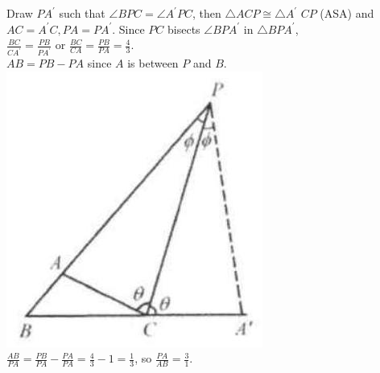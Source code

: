 \documentclass{article}
\begin{document}
Draw \(P A^{\prime}\) such that \(\angle B P C=\angle A^{\prime} P C\), then \(\triangle A C P \cong \triangle A^{\prime}\) \(C P\) (ASA) and \(A C=A^{\prime} C, P A=P A^{\prime}\). Since \(P C\) bisects \(\angle B P A^{\prime}\) in \(\triangle B P A^{\prime}\),\\
\(\frac{B C}{C A^{\prime}}=\frac{P B}{P A^{\prime}}\) or \(\frac{B C}{C A}=\frac{P B}{P A}=\frac{4}{3}\).\\
\(A B=P B-P A\) since \(A\) is between \(P\) and \(B\).\\
\centering
\includegraphics[width=\textwidth]{images/reasoning_image_1.jpg}\\
\(\frac{A B}{P A}=\frac{P B}{P A}-\frac{P A}{P A}=\frac{4}{3}-1=\frac{1}{3}\), so \(\frac{P A}{A B}=\frac{3}{1}\).\\
\end{document}
